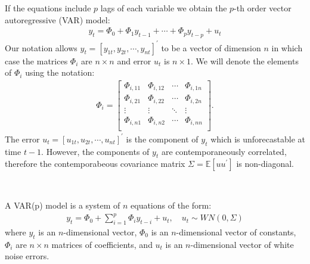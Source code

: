 If the equations include $p$ lags of each variable we obtain the $p$-th order vector autoregressive (VAR) model:
\begin{gather}\label{eq:varp}
    y_t = \Phi_0 + \Phi_1 y_{t-1} + \cdots + \Phi_p y_{t-p} + u_t
\end{gather}
Our notation allows $y_t = [y_{1t}, y_{2t}, \cdots, y_{nt}]^{\prime}$ to be a vector of dimension $n$ in which case the matrices $\Phi_i$ are $n \times n$ and error $u_t$ is $n \times 1$.
We will denote the elements of $\Phi_i$ using the notation:
\begin{gather*}
    \Phi_i = \begin{bmatrix}
        \Phi_{i,11} & \Phi_{i,12} & \cdots & \Phi_{i,1n} \\
        \Phi_{i,21} & \Phi_{i,22} & \cdots & \Phi_{i,2n} \\
        \vdots & \vdots & \ddots & \vdots \\
        \Phi_{i,n1} & \Phi_{i,n2} & \cdots & \Phi_{i,nn} \\
    \end{bmatrix}.
\end{gather*}
The error $u_t = [u_{1t}, u_{2t}, \cdots, u_{nt}]^{\prime}$ is the component of $y_t$ which is unforecastable at time $t-1$.
However, the components of $y_t$ are contemporaneously correlated, therefore the contemporabeous covariance matrix $\Sigma = \mathbb{E}[u u^{\prime}]$ is non-diagonal.
\begin{definition}[VAR$(p)$]
    \

    A VAR(p) model is a system of $n$ equations of the form:
    \begin{gather}\label{eq:varp-def}
        y_t = \Phi_0 + \sum_{i=1}^{p} \Phi_i y_{t-i} + u_t, \quad u_t \sim WN(0, \Sigma)
    \end{gather}
    where $y_t$ is an $n$-dimensional vector, $\Phi_0$ is an $n$-dimensional vector of constants, $\Phi_i$ are $n \times n$ matrices of coefficients, and $u_t$ is an $n$-dimensional vector of white noise errors.
\end{definition}

